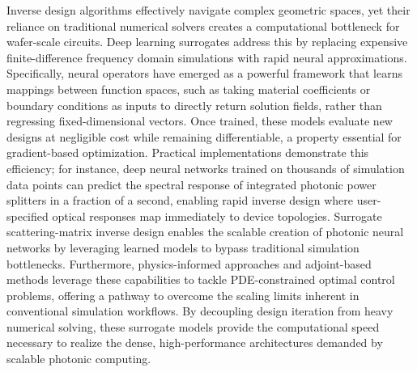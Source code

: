 \documentclass[11pt]{article}
\begin{document}
Inverse design algorithms effectively navigate complex geometric spaces, yet their reliance on traditional numerical solvers creates a computational bottleneck for wafer-scale circuits. Deep learning surrogates address this by replacing expensive finite-difference frequency domain simulations with rapid neural approximations. Specifically, neural operators have emerged as a powerful framework that learns mappings between function spaces, such as taking material coefficients or boundary conditions as inputs to directly return solution fields, rather than regressing fixed-dimensional vectors. \citep{doi_10_48550_arxiv_2303_10506_0452bde4} Once trained, these models evaluate new designs at negligible cost while remaining differentiable, a property essential for gradient-based optimization. Practical implementations demonstrate this efficiency; for instance, deep neural networks trained on thousands of simulation data points can predict the spectral response of integrated photonic power splitters in a fraction of a second, enabling rapid inverse design where user-specified optical responses map immediately to device topologies. Surrogate scattering-matrix inverse design enables the scalable creation of photonic neural networks by leveraging learned models to bypass traditional simulation bottlenecks. \citep{s2_753a5d83a96e0194da93bcb6f20fa0bd356e37fa_c11e3796} Furthermore, physics-informed approaches and adjoint-based methods leverage these capabilities to tackle PDE-constrained optimal control problems, offering a pathway to overcome the scaling limits inherent in conventional simulation workflows. By decoupling design iteration from heavy numerical solving, these surrogate models provide the computational speed necessary to realize the dense, high-performance architectures demanded by scalable photonic computing. \citep{doi_10_48550_arxiv_2601_00199_c689b34d} \citep{doi_10_1038_s41598_018_37952_2_076b64f9} \citep{doi_10_48550_arxiv_2606_12337_68b62bfa}
\end{document}
